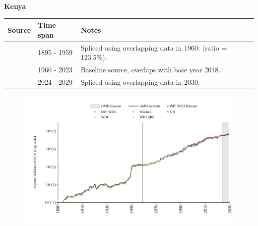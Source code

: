 \documentclass[12pt,a4paper,landscape]{article}
\begin{document}
\begin{adjustbox}{max totalsize={\paperwidth}{\paperheight},center}
\begin{minipage}[t][\textheight][t]{\textwidth}
\vspace*{0.5cm}
{}
\begin{center}
{\Large\bfseries Kenya}
\end{center}
\vspace{0.5cm}
\begin{table}[H]
\centering
\small
\begin{tabular}{|l|l|l|}
\hline
\textbf{Source} & \textbf{Time span} & \textbf{Notes} \\
\hline
\rowcolor{white}\cite{Mitchell}& 1895 - 1959 &Spliced using overlapping data in 1960: (ratio = 123.5\%).\\
\rowcolor{lightgray}\cite{WDI}& 1960 - 2023 &Baseline source, overlaps with base year 2018.\\
\rowcolor{white}\cite{IMF_WEO_forecast}& 2024 - 2029 &Spliced using overlapping data in 2030.\\
\hline
\end{tabular}
\end{table}
\begin{figure}[H]
\centering
\includegraphics[width=\textwidth,height=0.6\textheight,keepaspectratio]{graphs/KEN_imports.pdf}
\end{figure}
\end{minipage}
\end{adjustbox}
\end{document}
